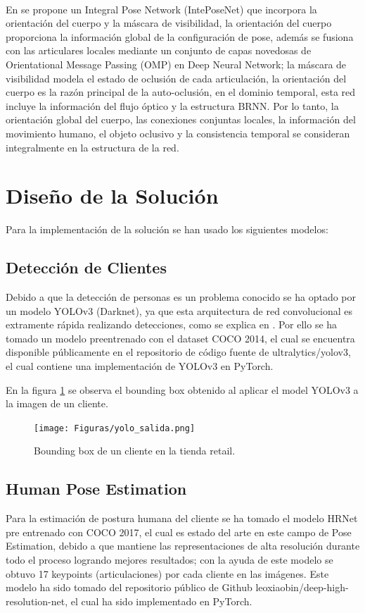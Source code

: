 \documentclass[conference]{IEEEtran}
\begin{document}
\\
En \cite{liu2018integral} se propone un Integral Pose Network (IntePoseNet) que incorpora la orientación del cuerpo y la máscara de visibilidad, la orientación del cuerpo proporciona la información global de la configuración de pose, además se fusiona con las articulares locales mediante un conjunto de capas novedosas de Orientational Message Passing (OMP) en Deep Neural Network; la máscara de visibilidad modela el estado de oclusión de cada articulación, la orientación del cuerpo es la razón principal de la auto-oclusión, en el dominio temporal, esta red incluye la información del flujo óptico y la estructura BRNN. Por lo tanto, la orientación global del cuerpo, las conexiones conjuntas locales, la información del movimiento humano, el objeto oclusivo y la consistencia temporal se consideran integralmente en la estructura de la red.

\section{Diseño de la Solución}

Para la implementación de la solución se han usado los siguientes modelos:

\subsection{Detección de Clientes}
Debido a que la detección de personas es un problema conocido se ha optado por un modelo YOLOv3 (Darknet), ya que esta arquitectura de red convolucional es extramente rápida realizando detecciones, como se explica en \cite{redmon2018yolov3}. Por ello se ha tomado un modelo preentrenado con el dataset COCO 2014, el cual se encuentra disponible públicamente en el repositorio de código fuente de ultralytics/yolov3, el cual contiene una implementación de YOLOv3 en PyTorch.

En la figura \ref{fig:yolo_salida} se observa el bounding box obtenido  al aplicar el model YOLOv3 a la imagen de un cliente.

\begin{figure}[hbtp]
\centering
\texttt{[image: Figuras/yolo\_salida.png]}
\caption{Bounding box de un cliente en la tienda retail.}
\label{fig:yolo_salida}
\end{figure}

\subsection{Human Pose Estimation}
Para la estimación de postura humana del cliente se ha tomado el modelo HRNet \cite{sun2019deep} pre entrenado con COCO 2017, el cual es estado del arte en este campo de Pose Estimation, debido a que mantiene las representaciones de alta resolución durante todo el proceso logrando mejores resultados; con la ayuda de este modelo se obtuvo 17 keypoints (articulaciones) por cada cliente en las imágenes. Este modelo ha sido tomado del repositorio público de Github leoxiaobin/deep-high-resolution-net, el cual ha sido implementado en PyTorch.
\end{document}
